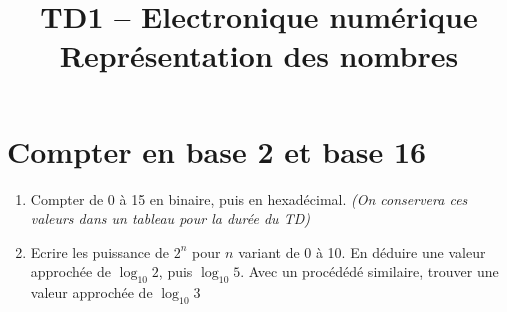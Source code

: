 \documentclass[a4paper,11pt]{article}
\title{{\Huge TD1 -- Electronique numérique}\\Représentation des nombres}
\date{}
\begin{document}
\maketitle

\section{Compter en base 2 et base 16}

\begin{enumerate}
\item{Compter de 0 à 15 en binaire, puis en hexadécimal. {\it (On conservera ces valeurs dans un tableau pour la durée du TD)}}
%

\item{Ecrire les puissance de $2^n$ pour $n$ variant de 0 à 10. En déduire une valeur approchée de $\log_{10} 2$, puis $\log_{10} 5$. Avec un procédédé similaire, trouver une valeur approchée de $\log_{10} 3$}


\end{enumerate}
\end{document}
